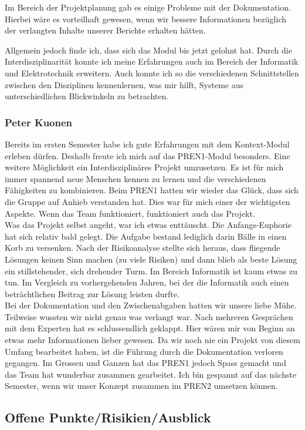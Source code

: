 Im Bereich der Projektplanung gab es einige Probleme mit der Dokumentation. Hierbei wäre es vorteilhaft gewesen, wenn wir bessere Informationen bezüglich der verlangten Inhalte unserer Berichte erhalten hätten.

Allgemein jedoch finde ich, dass sich das Modul bis jetzt gelohnt hat. Durch die Interdisziplinarität konnte ich meine Erfahrungen auch im Bereich der Informatik und Elektrotechnik erweitern. Auch konnte ich so die verschiedenen Schnittstellen zwischen den Disziplinen kennenlernen, was mir hilft, Systeme aus unterschiedlichen Blickwinkeln zu betrachten.

\subsubsection*{Peter Kuonen}
Bereits im ersten Semester habe ich gute Erfahrungen mit dem Kontext-Modul erleben dürfen. Deshalb freute ich mich auf das PREN1-Modul besonders. Eine weitere Möglichkeit ein Interdisziplinäres Projekt umzusetzen. Es ist für mich immer spannend neue Menschen kennen zu lernen und die verschiedenen Fähigkeiten zu kombinieren. Beim PREN1 hatten wir wieder das Glück, dass sich die Gruppe auf Anhieb verstanden hat. Dies war für mich einer der wichtigsten Aspekte. Wenn das Team funktioniert, funktioniert auch das Projekt.\\
%
Was das Projekt selbst angeht, war ich etwas enttäuscht. Die Anfangs-Euphorie hat sich relativ bald gelegt. Die Aufgabe bestand lediglich darin Bälle in einen Korb zu versenken. Nach der Risikoanalyse stellte sich heraus, dass fliegende Lösungen keinen Sinn machen (zu viele Risiken) und dann blieb als beste Lösung ein stillstehender, sich drehender Turm. Im Bereich Informatik ist  kaum etwas zu tun. Im Vergleich zu vorhergehenden Jahren, bei der die Informatik auch einen beträchtlichen Beitrag zur Lösung leisten durfte.\\
%
Bei der Dokumentation und den Zwischenabgaben hatten wir unsere liebe Mühe. Teilweise wussten wir nicht genau was verlangt war. Nach mehreren Gesprächen mit dem Experten hat es  schlussendlich geklappt. Hier wären mir von Beginn an etwas mehr Informationen lieber gewesen. Da wir noch nie ein Projekt von diesem Umfang bearbeitet haben, ist die Führung durch die Dokumentation verloren gegangen. 
Im Grossen und Ganzen hat das PREN1 jedoch Spass gemacht und das Team hat wunderbar zusammen gearbeitet. Ich bin gespannt auf das nächste Semester, wenn wir unser Konzept zusammen im PREN2 umsetzen können.

\subsection{Offene Punkte/Risikien/Ausblick}
